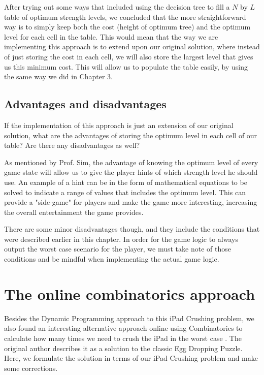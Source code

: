 \documentclass[12pt,a4paper,oneside]{report}
\begin{document}
After trying out some ways that included using the decision tree to fill a $N$ by $L$ table of optimum strength levels, we concluded that the more straightforward way is to simply keep both the cost (height of optimum tree) and the optimum level for each cell in the table. This would mean that the way we are implementing this approach is to extend upon our original solution, where instead of just storing the cost in each cell, we will also store the largest level that gives us this minimum cost. This will allow us to populate the table easily, by using the same way we did in Chapter 3.

\section{Advantages and disadvantages}
If the implementation of this approach is just an extension of our original solution, what are the advantages of storing the optimum level in each cell of our table? Are there any disadvantages as well? 

As mentioned by Prof. Sim, the advantage of knowing the optimum level of every game state will allow us to give the player hints of which strength level he should use. An example of a hint can be in the form of mathematical equations to be solved to indicate a range of values that includes the optimum level. This can provide a "side-game" for players and make the game more interesting, increasing the overall entertainment the game provides. 

There are some minor disadvantages though, and they include the conditions that were described earlier in this chapter. In order for the game logic to always output the worst case scenario for the player, we must take note of those conditions and be mindful when implementing the actual game logic.


\chapter{The online combinatorics approach}
Besides the Dynamic Programming approach to this iPad Crushing problem, we also found an interesting alternative approach online using Combinatorics to calculate how many times we need to crush the iPad in the worst case \cite{randomblogpost}. The original author describes it as a solution to the classic Egg Dropping Puzzle. Here, we formulate the solution in terms of our iPad Crushing problem and make some corrections.
\end{document}

